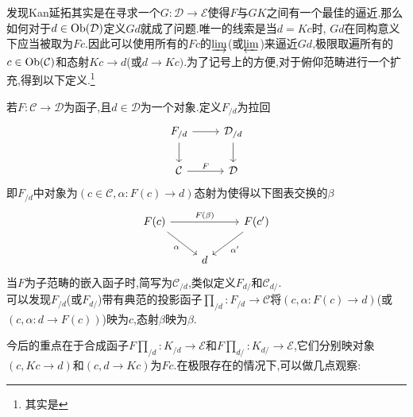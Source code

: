 发现Kan延拓其实是在寻求一个$G : \mathcal{D} \to \mathcal{E}$使得$F$与$GK$之间有一个最佳的逼近.那么如何对于$d \in \operatorname{Ob}(\mathcal{D})$定义$Gd$就成了问题.唯一的线索是当$d = Kc$时, $Gd$在同构意义下应当被取为$Fc$.因此可以使用所有的$Fc$的$\underrightarrow{\lim}$(或$\underleftarrow{\lim}$)来逼近$Gd$,极限取遍所有的$c \in \operatorname{Ob}(\mathcal{C})$和态射$Kc \to d$(或$d \to Kc)$.为了记号上的方便,对于俯仰范畴进行一个扩充,得到以下定义.\footnote{其实是\parencite[定义1.6.2]{李文威卷二}}
\begin{definition}
    若$F : \mathcal{C} \to \mathcal{D}$为函子,且$d \in \mathcal{D}$为一个对象.定义$F_{/d}$为拉回
    \[\begin{tikzcd}
	{F_{/d}} & {\mathcal{D}_{/d}} \\
	{\mathcal{C}} & {\mathcal{D}}
	\arrow[from=1-1, to=1-2]
	\arrow[from=1-1, to=2-1]
	\arrow[from=1-2, to=2-2]
	\arrow["F", from=2-1, to=2-2]
    \end{tikzcd}\]
    即$F_{/d}$中对象为$(c\in \mathcal{C},\alpha : F(c) \to d)$态射为使得以下图表交换的$\beta$
    \[\begin{tikzcd}
	{F(c)} && {F(c')} \\
	& d
	\arrow["{F(\beta)}", from=1-1, to=1-3]
	\arrow["\alpha"', from=1-1, to=2-2]
	\arrow["{\alpha'}", from=1-3, to=2-2]
    \end{tikzcd}\]
    当$F$为子范畴的嵌入函子时,简写为$\mathcal{C}_{/d}$,类似定义$F_{d/}$和$\mathcal{C}_{d/}$.\\
    可以发现$F_{/d}$(或$F_{d/}$)带有典范的投影函子$\prod_{/d}: F_{/d} \to \mathcal{C}$将$(c,\alpha: F(c) \to d)$(或$(c,\alpha:d \to F(c))$)映为$c$,态射$\beta$映为$\beta$.
\end{definition}
今后的重点在于合成函子$F \prod_{/d}: K_{/d} \to \mathcal{E}$和$F\prod_{d/}: K_{d/} \to \mathcal{E}$,它们分别映对象$(c,Kc \to d)$和$(c,d \to Kc)$为$Fc$.在极限存在的情况下,可以做几点观察:
